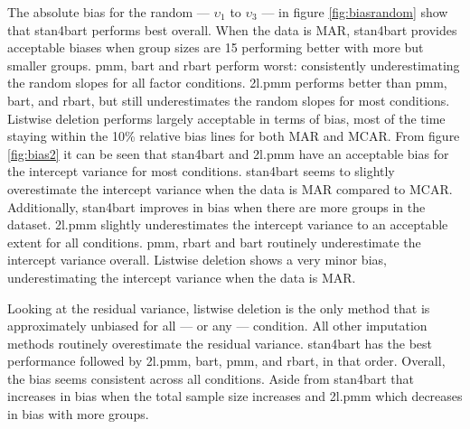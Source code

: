 \documentclass[3p,12pt,a4paper]{elsarticle}
\begin{document}
The absolute bias for the random  --- $\upsilon_1$ to $\upsilon_3$ --- in figure \ref{fig:biasrandom} show that stan4bart performs best overall. When the data is MAR, stan4bart provides acceptable biases when group sizes are 15 performing better with more but smaller groups. pmm, bart and rbart perform worst: consistently underestimating the random slopes for all factor conditions. 2l.pmm performs better than pmm, bart, and rbart, but still underestimates the random slopes for most conditions. Listwise deletion performs largely acceptable in terms of bias, most of the time staying within the 10\% relative bias lines for both MAR and MCAR.
From figure \ref{fig:bias2} it can be seen that stan4bart and 2l.pmm have an acceptable bias for the intercept variance for most conditions. stan4bart seems to slightly overestimate the intercept variance when the data is MAR compared to MCAR. Additionally, stan4bart improves in bias when there are more groups in the dataset. 2l.pmm slightly underestimates the intercept variance to an acceptable extent for all conditions. pmm, rbart and bart routinely underestimate the intercept variance overall. Listwise deletion shows a very minor bias, underestimating the intercept variance when the data is MAR. 

Looking at the residual variance, listwise deletion is the only method that is approximately unbiased for all --- or any --- condition. All other imputation methods routinely overestimate the residual variance. stan4bart has the best performance followed by 2l.pmm, bart, pmm, and rbart, in that order. Overall, the bias seems consistent across all conditions. Aside from stan4bart that increases in bias when the total sample size increases and 2l.pmm which decreases in bias with more groups. 
\end{document}
